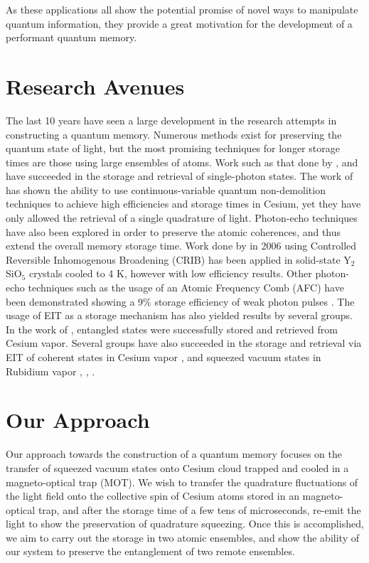 As these applications all show the potential promise of novel ways to manipulate quantum information, they provide a great motivation for the development of a performant quantum memory.



\section{Research Avenues} 

The last 10 years have seen a large development in the research attempts in constructing a quantum memory.  Numerous methods exist for preserving the quantum state of light, but the most promising techniques for longer storage times are those using large ensembles of atoms.  Work such as that done by \cite{Kuzmich05}, and \cite{Lukin05} have succeeded in the storage and retrieval of single-photon states.  The work of \cite{Polzik04} has shown the ability to use continuous-variable quantum non-demolition techniques to achieve high efficiencies and storage times in Cesium, yet they have only allowed the retrieval of a single quadrature of light.  Photon-echo techniques have also been explored in order to preserve the atomic coherences, and thus extend the overall memory storage time.  Work done by \cite{PhysRevLett.96.043602} in 2006 using Controlled Reversible Inhomogenous Broadening (CRIB) has been applied in solid-state Y$_2$SiO$_5$ crystals cooled to 4 K, however with low efficiency results.  Other photon-echo techniques such as the usage of an Atomic Frequency Comb (AFC) have been demonstrated showing a 9\% storage efficiency of weak photon pulses \cite{chaneliere2010efficient}.  The usage of EIT as a storage mechanism has also yielded results by several groups.  In the work of \cite{choi2008mapping}, entangled states were successfully stored and retrieved from Cesium vapor. Several groups have also succeeded in the storage and retrieval via EIT of coherent states in Cesium vapor \cite{CviklinskiPhD}, and squeezed vacuum states in Rubidium vapor \cite{Lvovsky08}, \cite{Kozuma08}, \cite{Kozuma09}.



\section{Our Approach}

Our approach towards the construction of a quantum memory focuses on the
transfer of squeezed vacuum states onto Cesium cloud trapped and cooled in a
magneto-optical trap (MOT).  We wish to transfer the quadrature fluctuations of the light field onto the collective spin of Cesium atoms stored in an magneto-optical trap, and after the storage time of a few tens of microseconds, re-emit the light to show the preservation of quadrature squeezing.  Once this is accomplished, we aim to carry out the storage in two atomic ensembles, and show the ability of our system to preserve the entanglement of two remote ensembles.













